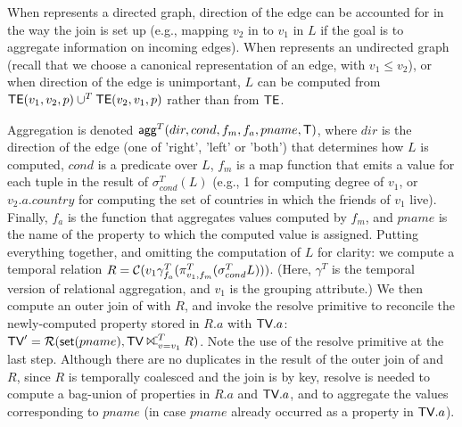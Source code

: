 When \tve represents a directed graph, direction of the edge can be
accounted for in the way the join is set up (e.g., mapping $v_2$ in
\te to $v_1$ in $L$ if the goal is to aggregate information on
incoming edges).  When \tve represents an undirected graph (recall
that we choose a canonical representation of an edge, with $v_1 \leq
v_2$), or when direction of the edge is unimportant, $L$ can be
computed from $\textsf{TE}(v_1,v_2,p) \cup^T \textsf{TE}(v_2,v_1,p)$ rather than from
$\textsf{TE}$.

Aggregation is denoted $\textsf{agg}^T(dir,cond,f_m,f_a,pname,\mathsf{T})$,
where $dir$ is the direction of the edge (one of 'right', 'left' or
'both') that determines how $L$ is computed, $cond$ is a predicate
over $L$, $f_m$ is a map function that emits a value for each tuple in
the result of $\sigma^T_{cond}(L)$ (e.g., 1 for computing degree of
$v_1$, or $v_2.a.country$ for computing the set of countries in which
the friends of $v_1$ live).  Finally, $f_a$ is the function that
aggregates values computed by $f_m$, and $pname$ is the name of the
property to which the computed value is assigned.  Putting everything
together, and omitting the computation of $L$ for clarity: we compute
a temporal relation $R = \mathcal{C}(v_1 \gamma^T_{f_a} (\pi^T_{v_1,f_m}
  (\sigma^T_{cond} L)))$. (Here, $\gamma^T$ is the temporal version of
relational aggregation, and $v_1$ is the grouping attribute.)  We then
compute an outer join of \tv with $R$, and invoke the resolve
primitive to reconcile the newly-computed property stored in $R.a$
with $\textsf{TV}.a$: $\tv' = \resolve{\insql{set}(pname)}{\tv
  \rightouterjoin^T_{v=v_1} R}$. Note the use of the resolve primitive
at the last step.  Although there are no duplicates in the result of
the outer join of \tv and $R$, since $R$ is temporally coalesced and
the join is by key, resolve is needed to compute a bag-union of
properties in $R.a$ and $\textsf{TV}.a$, and to aggregate the values
corresponding to $pname$ (in case $pname$ already occurred as a
property in $\textsf{TV}.a$).


